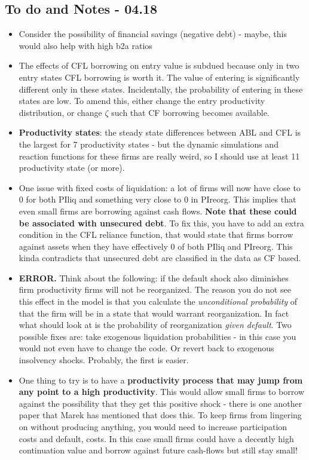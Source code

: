 \documentclass[12pt]{article}
\begin{document}
\subsection*{To do and Notes - 04.18}
\begin{itemize} \setlength\itemsep{0em} \small
    \item Consider the possibility of financial savings (negative debt) - maybe, this would also help with high b2a ratios
    \item The effects of CFL borrowing on entry value is subdued because only in two entry states CFL borrowing is worth it. The value of entering is significantly different only in these states. Incidentally, the probability of entering in these states are low. To amend this, either change the entry productivity distribution, or change $\zeta$ such that CF borrowing becomes available.
    \item \textbf{Productivity states}: the steady state differences between ABL and CFL is the largest for 7 productivity states - but the dynamic simulations and reaction functions for these firms are really weird, so I should use at least 11 productivity state (or more).
    \item One issue with fixed costs of liquidation: a lot of firms will now have close to 0 for both PIliq and something very close to 0 in PIreorg. This implies that even small firms are borrowing against cash flows.  \textbf{Note that these could be associated with unsecured debt}. To fix this, you have to add an extra condition in the CFL reliance function, that would state that firms borrow against assets when they have effectively 0 of both PIliq and PIreorg. This kinda contradicts that unsecured debt are classified in the data as CF based.
    \item \textbf{ERROR.} Think about the following: if the default shock also diminishes firm productivity firms will not be reorganized. The reason you do not see this effect in the model is that you calculate the \textit{unconditional probability} of that the firm will be in a state that would warrant reorganization. In fact what should look at is the probability of reorganization \textit{given default}. Two possible fixes are: take exogenous liquidation probabilities - in this case you would not even have to change the code. Or revert back to exogenous insolvency shocks. Probably, the first is easier.
    \item One thing to try is to have a \textbf{productivity process that may jump from any point to a high productivity}. This would allow small firms to borrow against the possibility that they get this positive shock - there is one another paper that Marek has mentioned that does this. To keep firms from lingering on without producing anything, you would need to increase participation costs and default, costs. In this case small firms could have a decently high continuation value and borrow against future cash-flows but still stay small! 
\end{itemize}  \normalsize
    
\end{document}
